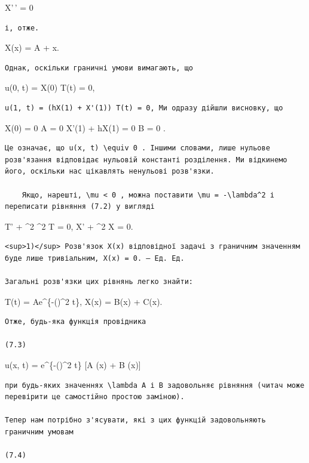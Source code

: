 \documentclass[
  ukrainian,
]{article}
\begin{document}
X'\,' = 0

\begin{verbatim}
і, отже.
\end{verbatim}

X(x) = A + x.

\begin{verbatim}
Однак, оскільки граничні умови вимагають, що
\end{verbatim}

u(0, t) = X(0) T(t) = 0,

\begin{verbatim}
u(1, t) = (hX(1) + X'(1)) T(t) = 0, Ми одразу дійшли висновку, що
\end{verbatim}

X(0) = 0 \Rightarrow A = 0 X'(1) + hX(1) = 0 \Rightarrow B = 0 .

\begin{verbatim}
Це означає, що u(x, t) \equiv 0 . Іншими словами, лише нульове розв'язання відповідає нульовій константі розділення. Ми відкинемо його, оскільки нас цікавлять ненульові розв'язки.

    Якщо, нарешті, \mu < 0 , можна поставити \mu = -\lambda^2 і переписати рівняння (7.2) у вигляді
\end{verbatim}

T' + \lambda\^{}2 \alpha\^{}2 T = 0, X' + \lambda\^{}2 X = 0.

\begin{verbatim}
<sup>1)</sup> Розв'язок X(x) відповідної задачі з граничним значенням буде лише тривіальним, X(x) = 0. — Ед. Ед.

Загальні розв'язки цих рівнянь легко знайти:
\end{verbatim}

T(t) = Ae\^{}\{-(\lambda \alpha)\^{}2 t\}, X(x) = B\sin(\lambda x) +
C\cos(\lambda x).

\begin{verbatim}
Отже, будь-яка функція провідника

(7.3)
\end{verbatim}

u(x, t) = e\^{}\{-(\lambda \alpha)\^{}2 t\} {[}A \sin(\lambda x) + B
\cos(\lambda x){]}

\begin{verbatim}
при будь-яких значеннях \lambda A і B задовольняє рівняння (читач може перевірити це самостійно простою заміною).

Тепер нам потрібно з'ясувати, які з цих функцій задовольняють граничним умовам

(7.4)
\end{verbatim}
\end{document}
